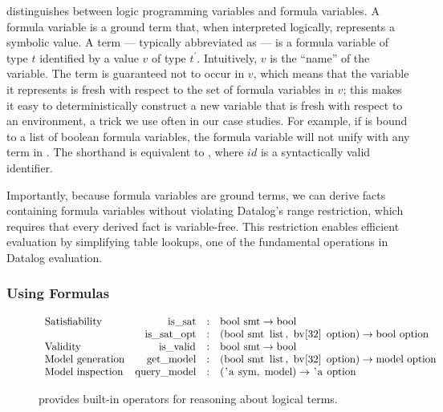 \documentclass[acmsmall,screen,nonacm]{acmart}
\theoremstyle{definition}
\begin{document}
\Name distinguishes between logic programming variables and formula variables.
A formula variable is a ground term that, when interpreted logically,
represents a symbolic value.
A term  --- typically abbreviated as  ---
is a formula variable of type $t$  identified
by a value $v$ of type $t^\prime$.
Intuitively, $v$ is the ``name'' of the variable.
The term  is guaranteed not to occur in $v$, which means
that the variable it represents is fresh with respect to the set of formula
variables in $v$; this makes it easy to deterministically construct a new
variable that is fresh with respect to an environment, a trick we use often in
our case studies.
For example, if  is bound to a list of boolean formula variables, the
formula variable  will not unify with any term in .
The shorthand  is equivalent to ,
where $id$ is a syntactically valid identifier.

Importantly, because formula variables are ground terms, we can derive facts
containing formula variables without violating Datalog's range restriction,
which requires that every derived fact is variable-free.
This restriction enables efficient evaluation by simplifying table lookups, one
of the fundamental operations in Datalog evaluation.

\subsubsection{Using Formulas}\label{sec:useformulas}

\begin{figure}[t!]
  \centering
  $\begin{array}{lrcl}
        \text{Satisfiability} & \ic{is_sat} &
            : & \ic{bool smt} \rightarrow \ic{bool}\\
                              & \ic{is_sat_opt} &
            : & (\ic{bool smt list},~\ic{bv[32] option}) \rightarrow \ic{bool option}\\
        \text{Validity} & \ic{is_valid} &
            : & \ic{bool smt} \rightarrow \ic{bool}\\
        \text{Model generation} & \ic{get_model} &
            : & (\ic{bool smt list},~\ic{bv[32] option}) \rightarrow \ic{model option}\\
        \text{Model inspection} & \ic{query_model} &
            : & (\ic{'a sym},~\ic{model}) \rightarrow \ic{'a option}
  \end{array}$
    \caption{\Name provides built-in operators for reasoning about logical terms.}
    \label{fig:logicfuncs}
\end{figure}
\end{document}
